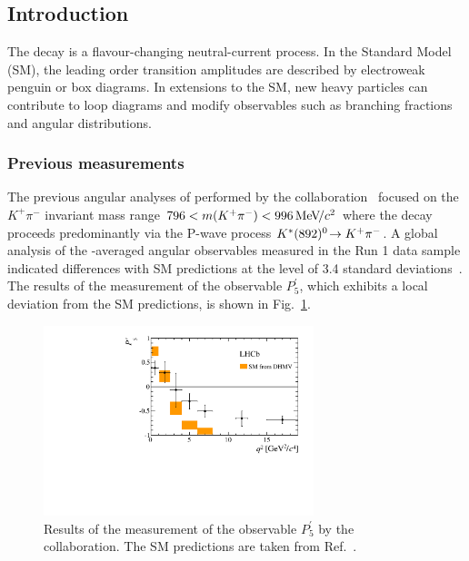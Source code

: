 \subsection{Introduction}
\label{sec:kpimm:introduction}

The decay \BdToKpimm is a flavour-changing neutral-current process. In the Standard Model (SM), the leading order transition amplitudes are described by electroweak penguin or box diagrams.  In extensions to the SM, new heavy particles can contribute to loop diagrams and modify observables such as branching fractions and angular distributions.

\subsubsection{Previous measurements}
The previous angular analyses of \BdToKpimm performed by the \lhcb collaboration~\cite{kstmm-0.3fb,kstmm-1fb,kstmm-1fb-pprime,kstmm-3fb} focused on the $K^{+}\pi^{-}$ invariant mass range $796<m({{K}^+}{{\pi}^-})<996{\mathrm{\,Me\kern -0.1em V\!/}c^2}$ where the decay proceeds predominantly via the P-wave process ${{K}^*}(892)^{0}\!\rightarrow {\ensuremath{{K}^+}}{\ensuremath{{\pi}^-}}$. A global analysis of the \CP-averaged angular observables measured in the \lhcb Run 1 data sample indicated differences with SM predictions at the level of 3.4 standard deviations~\cite{kstmm-3fb}. The results of the measurement of the observable $P_{5}^{'}$, which exhibits a local deviation from the SM predictions, is shown in Fig.~\ref{fig:kpimm:p5prime}.

\begin{figure}[!b]
\centering
\includegraphics[width=0.7\textwidth]{figs/kpimm/introduction/P5prime.pdf}
\caption{Results of the measurement of the observable $P_{5}^{'}$ by the \lhcb collaboration. The SM predictions are taken from Ref.~\cite{pprime-theory}.}
\label{fig:kpimm:p5prime}
\end{figure}

